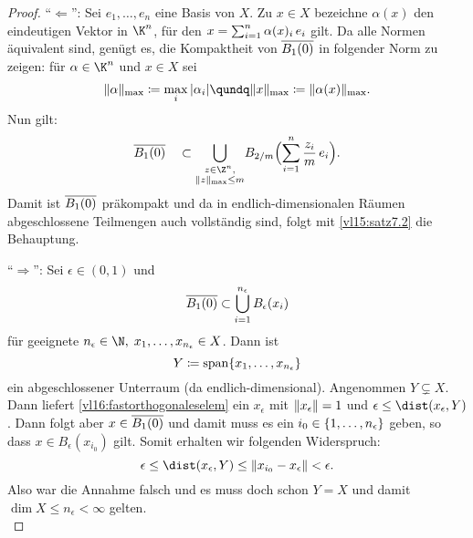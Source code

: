 \begin{proof}
    \enquote{$\Leftarrow$}: Sei $e_1,\dots,e_n$ eine Basis von $X$. 
    Zu $x\in X$ bezeichne $\alpha(x)$ den eindeutigen Vektor in $\K^n$,
    für den $x = \sum_{i=1}^n \alpha(x)_i\,e_i$ gilt.
    Da alle Normen äquivalent sind, genügt es, die Kompaktheit von 
    $\overline{B_1(0)}$ in folgender Norm zu zeigen: für $\alpha\in\K^n$ 
    und $x\in X$ sei
    \[ \norm{\alpha}_\mr{max} \defeq \max_i \, \abs{\alpha_i} \qundq
    \norm{x}_\mr{max} \defeq \norm{\alpha(x)}_\mr{max}  . \]
    Nun gilt:
    \[
        \setclosure{B_1(0)} \quad\subset
        \bigcup_{\substack{z\in\Z^n,\\\norm{z}_\mr{max}\leq m}}
        \mkern-3mu B_{2/m}\Bigl( \isum^n \frac{z_i}{m}\, e_i \Bigr)
    . \]
    Damit ist $\overline{B_1(0)}$ präkompakt und da in endlich-dimensionalen
    Räumen abgeschlossene Teilmengen auch vollständig sind, folgt mit
    \cref{vl15:satz7.2} die Behauptung.
    
\pagebreak[2]
    \enquote{$\Rightarrow$}: Sei $\epsilon\in(0,1)$ und
    \[ \overline{B_1(0)} \subset \bigcup_{i=1}^{n_\epsilon} B_\epsilon(x_i)
    \]
    für geeignete $n_\epsilon\in\N,\;x_1,\ldots,x_{n_\epsilon}\in X$. Dann ist
    \[ Y \coloneqq \operatorname{span}\{x_1,\dots,x_{n_\epsilon}\} \]
    ein abgeschlossener Unterraum (da endlich-dimensional). Angenommen
    $Y\subsetneq X$. Dann liefert \cref{vl16:fastorthogonaleselem}
    ein $x_\epsilon$ mit $\lVert x_\epsilon\rVert=1$ und $\epsilon \leq
    \dist(x_\epsilon, Y)$. Dann folgt aber $x\in \overline{B_1(0)}$
    und damit muss es ein $i_0\in\{1,\ldots,n_\epsilon\}$ geben, so dass
    $x\in B_\epsilon(x_{i_0})$ gilt. Somit erhalten wir folgenden Widerspruch:
    \[ \epsilon \leq \dist(x_\epsilon, Y) 
        \leq \norm{x_{i_0}-x_\epsilon}
        < \epsilon
    . \]
    Also war die Annahme falsch und es muss doch schon $Y=X$ und damit 
    $\dim X \leq n_\epsilon < \infty$ gelten.
    \\
\end{proof}

